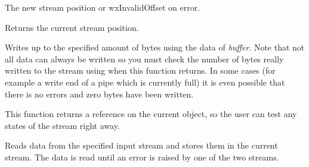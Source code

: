 


The new stream position or wxInvalidOffset on error.


\label{wxoutputstreamtello}


Returns the current stream position.


\label{wxoutputstreamwrite}


Writes up to the specified amount of bytes using the data of {\it buffer}. Note
that not all data can always be written so you must check the number of bytes
really written to the stream using  
when this function returns. In some cases (for example a write end of a pipe
which is currently full) it is even possible that there is no errors and zero
bytes have been written.

This function returns a reference on the current object, so the user can test
any states of the stream right away.


Reads data from the specified input stream and stores them 
in the current stream. The data is read until an error is raised
by one of the two streams.

